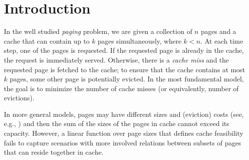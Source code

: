 \documentclass[11pt]{article}
\newcommand{\comment}[1]{}
\begin{document}
\section{Introduction}
In the well studied {\em paging} problem, we are given a collection of $n$ pages and a cache that can contain up to $k$ pages simultaneously, where $k<n$. At each time step, one of the pages is requested. If the requested page is already in the cache, the request is immediately served. Otherwise, there is a {\em cache miss} and the requested page is fetched to the cache; to ensure that the cache contains at most $k$ pages, some other page is potentially evicted. In the most fundamental model, the goal is to minimize the number of cache misses (or equivalently, number of evictions).


\comment{
In more general models, pages may have different sizes and (eviction) costs (see, e.g., \cite{adamaszek2018log,bansal2012randomized}) and then the sum of the sizes of the pages in the cache cannot exceed the cache size. However, a linear function over the page sizes that defines cache feasibility fails to capture scenarios with more involved relations between subsets of pages that can reside together in the cache. For example, consider a system in which pages share parts of their memory; here, only the missing memory parts of the requested page contribute to the increment of the cache size. This setting can be modeled using a {\em submodular} function to define cache feasibility. 
In a second example, items stored in cache may have running-time dependencies inflicting additional overhead in their mutual storage demand. Thus, the size of a page may increase when certain other pages are in the cache. {\bf Seffi: do you have a reference?.} 
A {\em supermodular} size function can describe cache feasibility in this case. These are two out of many examples for cache systems that exhibit a {\em non-linear} behavior. We motivate our model in Section in detail \ref{sec:motivation}.  
}
In more general models, pages may have different sizes and (eviction) costs (see, e.g., \cite{adamaszek2018log,bansal2012randomized}) and then the sum of the sizes of the pages in cache cannot exceed its capacity. However, a linear function over page sizes that defines cache feasibility fails to capture scenarios with more involved relations between subsets of pages that can reside together in cache. %
\end{document}
